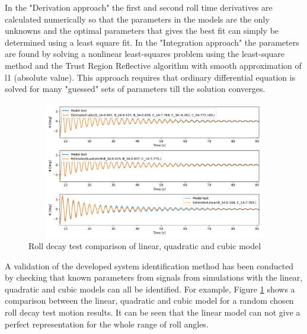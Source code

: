 In the "Derivation approach" the first and second roll time derivatives are calculated numerically so that the parameters in the models are the only unknowns and the optimal parameters that gives the best fit can simply be determined using a least square fit.
In the "Integration approach" the parameters are found by solving a nonlinear least-squares problem using the least-square method \parencite{noauthor_scipyoptimizeleast_squares_nodate} and the Trust Region Reflective algorithm with smooth approximation of l1 (absolute value). This approach requires that ordinary differential equation is solved for many "guessed" sets of parameters till the solution converges.

\begin{figure}[H]
    \centering
    \includegraphics[width=12cm, height = 6cm ]{figures/roll_decay_model_compare.pdf}
    \caption{Roll decay test comparison of linear, quadratic and cubic model}
    \label{fig:roll_decay_model_compare}
\end{figure}

A validation of the developed system identification method has been conducted by checking that known parameters from signals from simulations with the linear, quadratic and cubic models can all be identified. For example,
Figure \ref{fig:roll_decay_model_compare} shows a comparison between the linear, quadratic and cubic model for a random chosen roll decay test motion results. It can be seen that the linear model can not give a perfect representation for the whole range of roll angles.    



